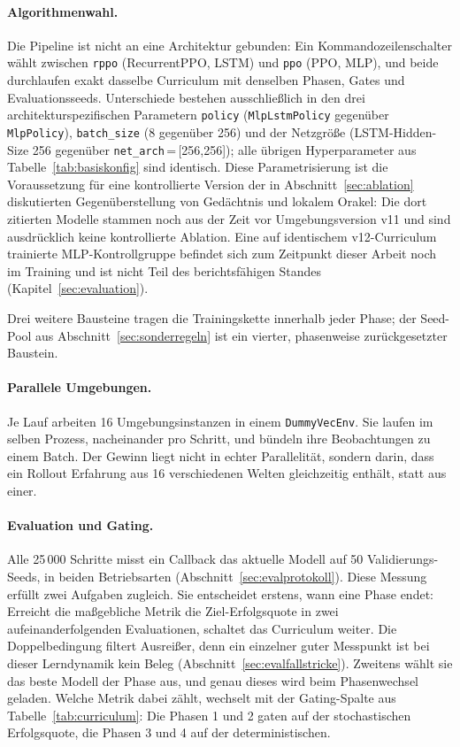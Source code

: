 \documentclass[11pt,a4paper]{article}
\begin{document}
\paragraph{Algorithmenwahl.} Die Pipeline ist nicht an eine Architektur
gebunden: Ein Kommandozeilenschalter wählt zwischen \texttt{rppo}
(RecurrentPPO, LSTM) und \texttt{ppo} (PPO, MLP), und beide durchlaufen exakt
dasselbe Curriculum mit denselben Phasen, Gates und Evaluationsseeds.
Unterschiede bestehen ausschließlich in den drei architekturspezifischen
Parametern \texttt{policy} (\texttt{MlpLstmPolicy} gegenüber
\texttt{MlpPolicy}), \texttt{batch\_size} (8 gegenüber 256) und der Netzgröße
(LSTM-Hidden-Size 256 gegenüber \texttt{net\_arch}\,=\,[256,256]); alle
übrigen Hyperparameter aus Tabelle~\ref{tab:basiskonfig} sind identisch.
Diese Parametrisierung ist die Voraussetzung für eine kontrollierte Version
der in Abschnitt~\ref{sec:ablation} diskutierten Gegenüberstellung von
Gedächtnis und lokalem Orakel: Die dort zitierten Modelle stammen noch aus
der Zeit vor Umgebungsversion v11 und sind ausdrücklich keine kontrollierte
Ablation. Eine auf identischem v12-Curriculum trainierte MLP-Kontrollgruppe
befindet sich zum Zeitpunkt dieser Arbeit noch im Training und ist nicht Teil
des berichtsfähigen Standes (Kapitel~\ref{sec:evaluation}).

Drei weitere Bausteine tragen die Trainingskette innerhalb jeder Phase; der
Seed-Pool aus Abschnitt~\ref{sec:sonderregeln} ist ein vierter, phasenweise
zurückgesetzter Baustein.

\paragraph{Parallele Umgebungen.} Je Lauf arbeiten 16 Umgebungsinstanzen in
einem \texttt{DummyVecEnv}. Sie laufen im selben Prozess, nacheinander pro
Schritt, und bündeln ihre Beobachtungen zu einem Batch. Der Gewinn liegt nicht
in echter Parallelität, sondern darin, dass ein Rollout Erfahrung aus 16
verschiedenen Welten gleichzeitig enthält, statt aus einer.

\paragraph{Evaluation und Gating.} Alle 25\,000 Schritte misst ein Callback
das aktuelle Modell auf 50 Validierungs-Seeds, in beiden Betriebsarten
(Abschnitt~\ref{sec:evalprotokoll}). Diese Messung erfüllt zwei Aufgaben
zugleich. Sie entscheidet erstens, wann eine Phase endet: Erreicht die
maßgebliche Metrik die Ziel-Erfolgsquote in zwei aufeinanderfolgenden
Evaluationen, schaltet das Curriculum weiter. Die Doppelbedingung filtert
Ausreißer, denn ein einzelner guter Messpunkt ist bei dieser Lerndynamik kein
Beleg (Abschnitt~\ref{sec:evalfallstricke}). Zweitens wählt sie das beste
Modell der Phase aus, und genau dieses wird beim Phasenwechsel geladen. Welche
Metrik dabei zählt, wechselt mit der Gating-Spalte aus Tabelle~\ref{tab:curriculum}:
Die Phasen 1 und 2 gaten auf der stochastischen Erfolgsquote, die Phasen 3
und 4 auf der deterministischen.
\end{document}
